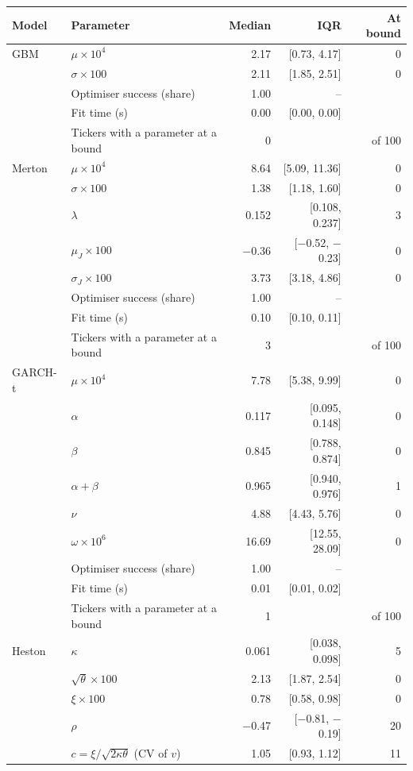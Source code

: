 \begin{tabular}{llrrr}
\toprule
Model & Parameter & Median & IQR & At bound \\
\midrule
GBM & $\mu\times 10^4$ & 2.17 & [0.73, 4.17] & 0 \\
 & $\sigma\times 100$ & 2.11 & [1.85, 2.51] & 0 \\
 & Optimiser success (share) & 1.00 & -- &  \\
 & Fit time (s) & 0.00 & [0.00, 0.00] &  \\
 & Tickers with a parameter at a bound & 0 &  & of 100 \\
Merton & $\mu\times 10^4$ & 8.64 & [5.09, 11.36] & 0 \\
 & $\sigma\times 100$ & 1.38 & [1.18, 1.60] & 0 \\
 & $\lambda$ & 0.152 & [0.108, 0.237] & 3 \\
 & $\mu_J\times 100$ & $-$0.36 & [$-$0.52, $-$0.23] & 0 \\
 & $\sigma_J\times 100$ & 3.73 & [3.18, 4.86] & 0 \\
 & Optimiser success (share) & 1.00 & -- &  \\
 & Fit time (s) & 0.10 & [0.10, 0.11] &  \\
 & Tickers with a parameter at a bound & 3 &  & of 100 \\
GARCH-t & $\mu\times 10^4$ & 7.78 & [5.38, 9.99] & 0 \\
 & $\alpha$ & 0.117 & [0.095, 0.148] & 0 \\
 & $\beta$ & 0.845 & [0.788, 0.874] & 0 \\
 & $\alpha+\beta$ & 0.965 & [0.940, 0.976] & 1 \\
 & $\nu$ & 4.88 & [4.43, 5.76] & 0 \\
 & $\omega\times 10^6$ & 16.69 & [12.55, 28.09] & 0 \\
 & Optimiser success (share) & 1.00 & -- &  \\
 & Fit time (s) & 0.01 & [0.01, 0.02] &  \\
 & Tickers with a parameter at a bound & 1 &  & of 100 \\
Heston & $\kappa$ & 0.061 & [0.038, 0.098] & 5 \\
 & $\sqrt{\theta}\times 100$ & 2.13 & [1.87, 2.54] & 0 \\
 & $\xi\times 100$ & 0.78 & [0.58, 0.98] & 0 \\
 & $\rho$ & $-$0.47 & [$-$0.81, $-$0.19] & 20 \\
 & $c=\xi/\sqrt{2\kappa\theta}$ (CV of $v$) & 1.05 & [0.93, 1.12] & 11 \\

\end{tabular}
